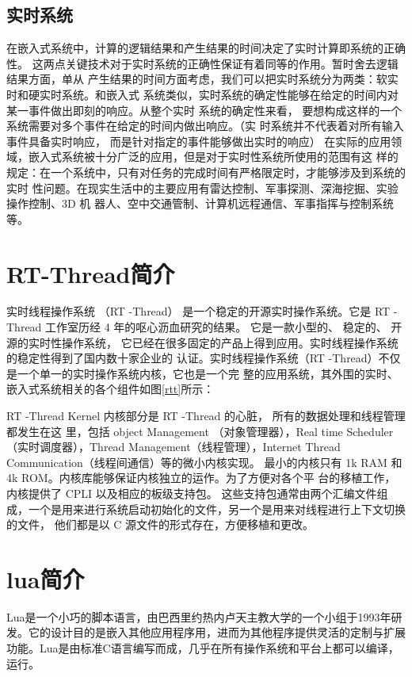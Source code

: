 \subsection{实时系统}
在嵌入式系统中，计算的逻辑结果和产生结果的时间决定了实时计算即系统的正确性。
这两点关键技术对于实时系统的正确性保证有着同等的作用。暂时舍去逻辑结果方面，单从
产生结果的时间方面考虑，我们可以把实时系统分为两类：软实时和硬实时系统。和嵌入式
系统类似，实时系统的确定性能够在给定的时间内对某一事件做出即刻的响应。从整个实时
系统的确定性来看， 要想构成这样的一个系统需要对多个事件在给定的时间内做出响应。（实
时系统并不代表着对所有输入事件具备实时响应， 而是针对指定的事件能够做出实时的响应）
在实际的应用领域，嵌入式系统被十分广泛的应用，但是对于实时性系统所使用的范围有这
样的规定：在一个系统中，只有对任务的完成时间有严格限定时，才能够涉及到系统的实时
性问题。在现实生活中的主要应用有雷达控制、军事探测、深海挖掘、实验操作控制、3D 机
器人、空中交通管制、计算机远程通信、军事指挥与控制系统等。

\section{RT-Thread简介}
实时线程操作系统 （RT -Thread）
是一个稳定的开源实时操作系统。它是 RT -Thread
工作室历经 4 年的呕心沥血研究的结果。 它是一款小型的、 稳定的、 开源的实时性操作系统，
它已经在很多固定的产品上得到应用。实时线程操作系统的稳定性得到了国内数十家企业的
认证。实时线程操作系统（RT -Thread）不仅是一个单一的实时操作系统内核，它也是一个完
整的应用系统，其外围的实时、嵌入式系统相关的各个组件如图\ref{rtt}所示：

RT -Thread Kernel 内核部分是 RT -Thread 的心脏， 所有的数据处理和线程管理都发生在这
里，包括 object  Management （对象管理器），Real  time  Scheduler（实时调度器），Thread
Management（线程管理），Internet Thread Communication（线程间通信）等的微小内核实现。
最小的内核只有 1k  RAM 和 4k  ROM。内核库能够保证内核独立的运作。为了方便对各个平
台的移植工作， 内核提供了 CPLI 以及相应的板级支持包。 这些支持包通常由两个汇编文件组
成，一个是用来进行系统启动初始化的文件，另一个是用来对线程进行上下文切换的文件，
他们都是以 C 源文件的形式存在，方便移植和更改。

\section{lua简介}

Lua是一个小巧的脚本语言，由巴西里约热内卢天主教大学的一个小组于1993年研发。它的设计目的是嵌入其他应用程序用，进而为其他程序提供灵活的定制与扩展功能。Lua是由标准C语言编写而成，几乎在所有操作系统和平台上都可以编译，运行。

